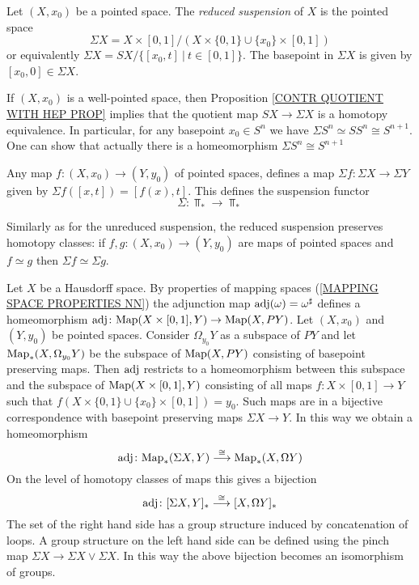 \begin{definition}
Let $(X, x_{0})$ be a pointed space. The \emph{reduced suspension} of $X$ is the 
pointed space
\[
\Sigma X = X \times [0, 1]/(X\times \{0, 1\}\cup \{x_{0}\}\times [0, 1])
\]
or equivalently $\Sigma X = SX/\{[x_{0}, t] \ | \ t\in [0, 1]\}$.
The basepoint in $\Sigma X$ is given by $[x_{0}, 0]\in \Sigma X$. 
\end{definition}


\begin{note}
If $(X, x_{0})$ is a well-pointed space, then  Proposition \ref{CONTR QUOTIENT WITH HEP PROP}
implies that the quotient map $SX \to \Sigma X$ is a homotopy equivalence. In particular, 
for any basepoint $x_{0}\in S^{n}$ we have $\Sigma S^{n} \simeq SS^{n} \cong S^{n+1}$. 
One can show that actually there is a homeomorphism $\Sigma  S^{n} \cong S^{n+1}$ 
\end{note}


\begin{note}
\label{SUSPENSION LOOP ADJUNCTION NOTE}
Any map  $f\colon (X, x_{0}) \to (Y, y_{0})$ of pointed spaces, defines a map  
$\Sigma f\colon \Sigma X \to  \Sigma Y$ given by $\Sigma f ([x, t]) = [f(x), t]$. This 
defines the suspension functor
\[
\Sigma \colon \Top_{\ast} \to \Top_{\ast}
\] 
\end{note}

Similarly as for the unreduced suspension, the reduced suspension preserves 
homotopy classes: if $f, g\colon (X, x_{0}) \to (Y, y_{0})$ are maps of pointed spaces 
and  $f\simeq g$ then $\Sigma f \simeq \Sigma g$. 

Let $X$ be a Hausdorff space. By properties of mapping spaces 
(\ref{MAPPING SPACE PROPERTIES NN}) the adjunction map $\operatorname{adj}(\omega) = \omega^{\sharp}$
defines a homeomorphism $\operatorname{adj}\colon \mathrm{Map}(X\times [0, 1], Y) \to \mathrm{Map}(X, PY)$. Let 
$(X, x_{0})$ and  $(Y, y_{0})$ be pointed spaces. Consider $\Omega_{y_{0}} Y$ as a subspace 
of $PY$ and let $\mathrm{Map}_{\ast}(X, \Omega_{y_{0}} Y)$ be the subspace of    
$\mathrm{Map}(X, PY)$ consisting of basepoint preserving maps. Then $\operatorname{adj}$ 
restricts to a homeomorphism between this subspace and the subspace of 
$\mathrm{Map}(X\times [0, 1], Y)$ consisting of all maps $f\colon X\times [0, 1]\to Y$ such that 
$f(X\times \{0, 1\}\cup \{x_{0}\}\times [0, 1]) = y_{0}$. Such maps are in a bijective 
correspondence with basepoint preserving maps $\Sigma X \to Y$. In this way we 
obtain a homeomorphism 
\[
\operatorname{adj}\colon \mathrm{Map}_{\ast}(\Sigma X, Y) \overset{\cong}{\longrightarrow} \mathrm{Map}_{\ast}(X, \Omega Y)
\]
On the level of homotopy classes of maps this gives a bijection 
\[
\operatorname{adj}\colon [\Sigma X, Y]_{\ast} \overset{\cong}{\longrightarrow} [X, \Omega Y]_{\ast}
\]
The set of the right hand side has a group structure induced by concatenation of 
loops. A group structure on the left hand side can be defined using the pinch map 
$\Sigma X \to \Sigma X \vee \Sigma X$. In this way the above bijection becomes 
an isomorphism of groups. 

